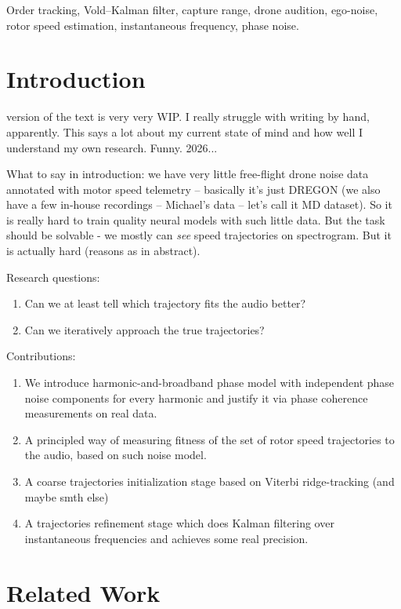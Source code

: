 \documentclass[journal]{IEEEtran}
\begin{document}
\begin{IEEEkeywords}
Order tracking, Vold--Kalman filter, capture range, drone audition,
ego-noise, rotor speed estimation, instantaneous frequency, phase noise.
\end{IEEEkeywords}

\section{Introduction}
\label{sec:intro}

 version of the text is very very WIP. I really struggle with writing
by hand, apparently. This says a lot about my current state of mind and how well I understand
my own research. Funny. 2026...

What to say in introduction: we have very little free-flight drone noise data annotated with
motor speed telemetry -- basically it's just DREGON (we also have a few in-house
recordings -- Michael's data -- let's call it MD dataset). So it is really hard to train
quality neural models with such little data. But the task should be solvable - we mostly can
\emph{see} speed trajectories on spectrogram. But it is actually hard (reasons as in abstract).

Research questions:
\begin{enumerate}
\item Can we at least tell which trajectory fits the audio better?
\item Can we iteratively approach the true trajectories?
\end{enumerate}

Contributions:

\begin{enumerate}
\item We introduce harmonic-and-broadband phase model with independent phase noise components for every harmonic and justify it via phase coherence measurements on real data. 
\item A principled way of measuring fitness of the set of rotor speed trajectories to the audio, based on such noise model.
\item A coarse trajectories initialization stage based on Viterbi ridge-tracking (and maybe smth else)
\item A trajectories refinement stage which does Kalman filtering over instantaneous frequencies and achieves some real precision.
\end{enumerate}

\section{Related Work}
\label{sec:related}
\end{document}
